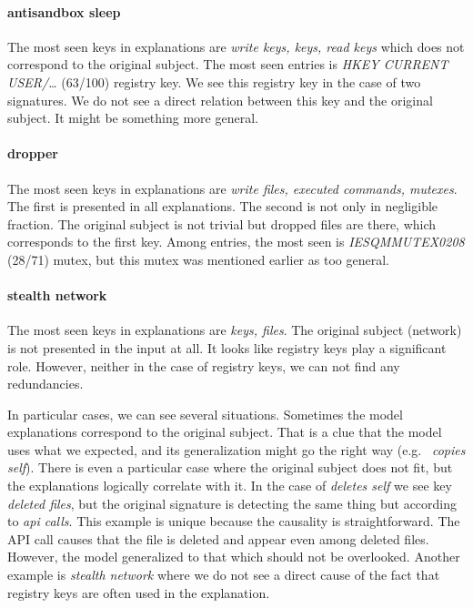 \paragraph{antisandbox sleep}
The most seen keys in explanations are \emph{write keys, keys, read keys} which does not correspond to the original subject. The most seen entries is \emph{HKEY CURRENT USER/\dots} (63/100) registry key. We see this registry key in the case of two signatures. We do not see a direct relation between this key and the original subject. It might be something more general.

\paragraph{dropper}
The most seen keys in explanations are \emph{write files, executed commands, mutexes}. The first is presented in all explanations. The second is not only in negligible fraction. The original subject is not trivial but dropped files are there, which corresponds to the first key. Among entries, the most seen is \emph{IESQMMUTEX0208} (28/71) mutex, but this mutex was mentioned earlier as too general.

\paragraph{stealth network}
The most seen keys in explanations are \emph{keys, files}. The original subject (network) is not presented in the input at all. It looks like registry keys play a significant role. However, neither in the case of registry keys, we can not find any redundancies.

In particular cases, we can see several situations. Sometimes the model explanations correspond to the original subject. That is a clue that the model uses what we expected, and its generalization might go the right way (e.g. \ \emph{copies self}). There is even a particular case where the original subject does not fit, but the explanations logically correlate with it. In the case of \emph{deletes self} we see key \emph{deleted files}, but the original signature is detecting the same thing but according to \emph{api calls}. This example is unique because the causality is straightforward. The API call causes that the file is deleted and appear even among deleted files. However, the model generalized to that which should not be overlooked. Another example is \emph{stealth network} where we do not see a direct cause of the fact that registry keys are often used in the explanation.


